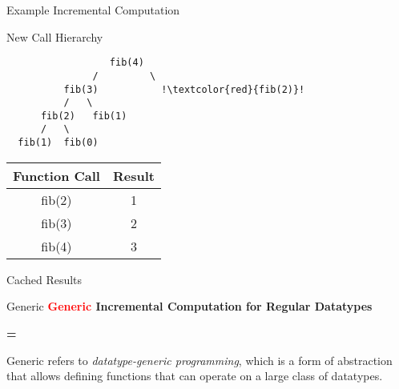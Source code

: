 \begin{slide}{Example Incremental Computation}
\begin{minipage}{.45\textwidth}
\begin{center}
New Call Hierarchy

\vspace*{.7cm}
\begin{verbatim}
                  fib(4)  
               /         \
          fib(3)           !\textcolor{red}{fib(2)}!
          /   \      
      fib(2)   fib(1)
      /   \
  fib(1)  fib(0)
\end{verbatim}
\end{center}
\end{minipage}
\hfill
\begin{minipage}{.45\textwidth}
  \begin{center}
    \begin{table}[h]
      \begin{tabular}{ | c | c | }
        \hline
        \textbf{Function Call} & \textbf{Result} \\ 
        \hline
        fib(2) & 1 \\
        \hline
        fib(3) & 2 \\
        \hline
        fib(4) & 3 \\
        \hline
      \end{tabular}
    \end{table}
    \vspace*{0.7cm}

    Cached Results
  \end{center}
\end{minipage}
\end{slide}


\begin{slide}{Generic}
\centering
\large \textbf{\textcolor{red}{Generic} Incremental Computation for Regular Datatypes}

\vspace*{.5cm}
\textbf{=}
\vspace*{.5cm}

Generic refers to \textit{datatype-generic programming}, which is a form of abstraction that allows defining functions that can operate on a large class of datatypes. 

\end{slide}


